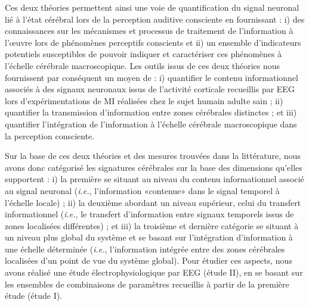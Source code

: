 Ces deux théories permettent ainsi une voie de quantification du signal neuronal lié à l'état cérébral lors de la perception auditive consciente en fournissant : i) des connaissances sur les mécanismes et processus de traitement de l'information à l'œuvre lors de phénomènes perceptifs conscients et ii) un ensemble d'indicateurs potentiels susceptibles de pouvoir indiquer et caractériser ces phénomènes à l'échelle cérébrale macroscopique. 
Les outils issus de ces deux théories nous fournissent par conséquent un moyen de : i) quantifier le contenu informationnel associés à des signaux neuronaux issus de l’activité corticale recueillis par EEG lors d'expérimentations de MI réalisées chez le sujet humain adulte sain ; ii) quantifier la transmission d'information entre zones cérébrales distinctes ; et iii) quantifier l'intégration de l'information à l'échelle cérébrale macroscopique dans la perception consciente. 

Sur la base de ces deux théories et des mesures trouvées dans la littérature, nous avons donc catégorisé les signatures cérébrales sur la base des dimensions qu'elles supportent : i) la première se situant au niveau du contenu informationnel associé au signal neuronal (\textit{i.e.}, l'information «contenue» dans le signal temporel à l'échelle locale) ; ii) la deuxième abordant un niveau supérieur, celui du transfert informationnel (\textit{i.e.}, le transfert d'information entre signaux temporels issus de zones localisées différentes) ; et iii) la troisième et dernière catégorie se situant à un niveau plus global du système et se basant sur l'intégration d'information à une échelle déterminée (\textit{i.e.}, l'information intégrée entre des zones cérébrales localisées d'un point de vue du système global). 
Pour étudier ces aspects, nous avons réalisé une étude électrophysiologique par EEG (étude II), en se basant sur les ensembles de combinaisons de paramètres recueillis à partir de la première étude (étude I). 


